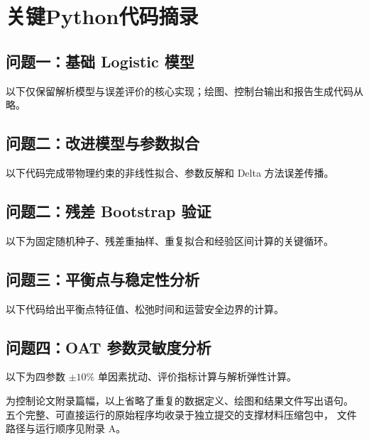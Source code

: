 \documentclass[12pt,a4paper]{ctexart}
\begin{document}
\section{关键Python代码摘录}

\subsection{问题一：基础 Logistic 模型}

以下仅保留解析模型与误差评价的核心实现；绘图、控制台输出和报告生成代码从略。


\subsection{问题二：改进模型与参数拟合}

以下代码完成带物理约束的非线性拟合、参数反解和 Delta 方法误差传播。


\subsection{问题二：残差 Bootstrap 验证}

以下为固定随机种子、残差重抽样、重复拟合和经验区间计算的关键循环。


\subsection{问题三：平衡点与稳定性分析}

以下代码给出平衡点特征值、松弛时间和运营安全边界的计算。


\subsection{问题四：OAT 参数灵敏度分析}

以下为四参数 $\pm10\%$ 单因素扰动、评价指标计算与解析弹性计算。


为控制论文附录篇幅，以上省略了重复的数据定义、绘图和结果文件写出语句。
五个完整、可直接运行的原始程序均收录于独立提交的支撑材料压缩包中，
文件路径与运行顺序见附录 A。
\end{document}
